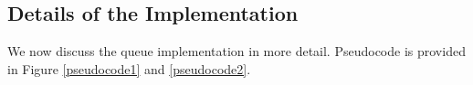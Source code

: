 \subsection{Details of the Implementation}

We now discuss the queue implementation in more detail.  Pseudocode is provided in Figure \ref{pseudocode1} and \ref{pseudocode2}.

\renewcommand{\algorithmiccomment}[1]{\hfill\eqparbox{COMMENTDOUBLE}{\com\ #1}}


